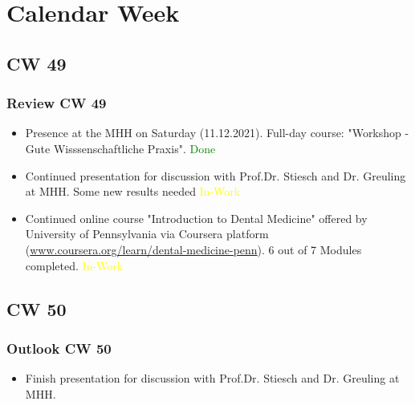 \section{Calendar Week}
\subsection{CW 49}
\begin{frame}
  \frametitle{Review CW 49}
	\begin{itemize}
		\item Presence at the MHH on Saturday (11.12.2021). Full-day course: "Workshop - Gute Wisssenschaftliche Praxis". \textcolor{green}{Done}		
		\item Continued presentation for discussion with Prof.Dr. Stiesch and Dr. Greuling at MHH. Some new results needed \textcolor{yellow}{In-Work}
		\item Continued online course "Introduction to Dental Medicine" offered by University of Pennsylvania via Coursera platform (\url{www.coursera.org/learn/dental-medicine-penn}). 6 out of 7 Modules completed. \textcolor{yellow}{In-Work}
	\end{itemize}
\end{frame}


\subsection{CW 50}
\begin{frame}
  \frametitle{Outlook CW 50}
	\begin{itemize}
		\item Finish presentation for discussion with Prof.Dr. Stiesch and Dr. Greuling at MHH.
	\end{itemize}
\end{frame}

